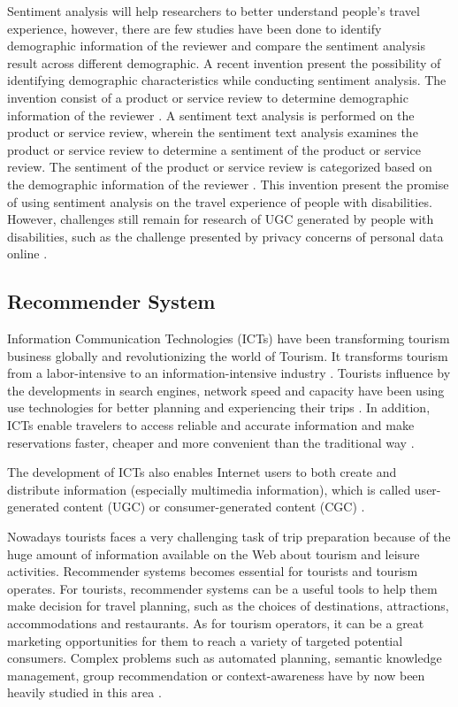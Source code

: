 \documentclass[sigconf]{acmart}
\begin{document}
Sentiment analysis will help researchers to better understand people's travel experience, however, there are few studies have been done to identify demographic information of the reviewer and compare the sentiment analysis result across different demographic. A recent invention present the possibility of identifying demographic characteristics while conducting sentiment analysis. The invention consist of a product or service review to determine demographic information of the reviewer \cite{Bhatt2014}. A sentiment text analysis is performed on the product or service review, wherein the sentiment text analysis examines the product or service review to determine a sentiment of the product or service review. The sentiment of the product or service review is categorized based on the demographic information of the reviewer \cite{Bhatt2014}. This invention present the promise of using sentiment analysis on the travel experience of people with disabilities. However, challenges still remain for research of UGC generated by people with disabilities, such as the challenge presented by privacy concerns of personal data online \cite{lazar}. 


\subsection{Recommender System}
Information Communication Technologies (ICTs) have been transforming tourism business
globally and revolutionizing the world of Tourism. It transforms tourism from a
labor-intensive to an information-intensive industry \cite{Williams201787}.
Tourists influence by the developments in search engines, network speed and capacity 
have been using use technologies for better planning and experiencing their
trips \cite{XIE2017101}. In addition, ICTs enable travelers to access reliable and
accurate information and make reservations faster, cheaper and more convenient than
the traditional way \cite{chung2009}.

The development of ICTs also enables Internet users to both create and distribute
information (especially multimedia information), which is called user-generated 
content (UGC) or consumer-generated content (CGC) \cite{chung2009}.

Nowadays tourists faces a very challenging task of trip preparation because of the
huge amount of information available on the Web about tourism and leisure activities.
Recommender systems becomes essential for tourists and tourism operates. For tourists,
recommender systems can be a useful tools to help them make decision for travel
planning, such as the choices of destinations, attractions, accommodations and
restaurants. As for tourism operators, it can be a great marketing opportunities for
them to reach a variety of targeted potential consumers. Complex problems such as
automated planning, semantic knowledge management, group recommendation or
context-awareness have by now been heavily studied in this area \cite{morenorecommender}. 
\end{document}

